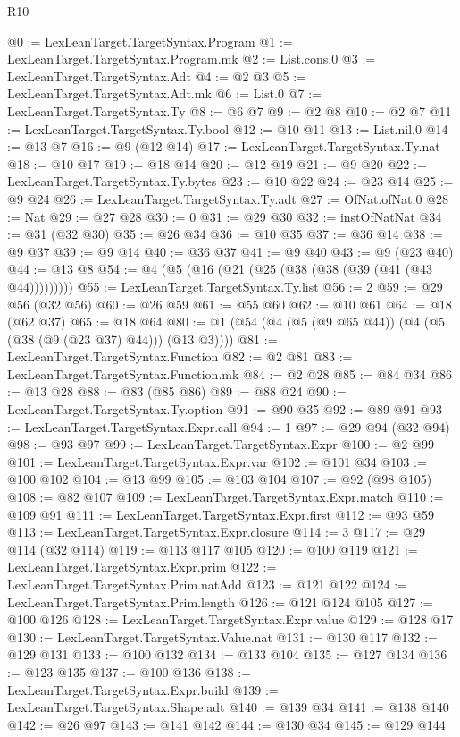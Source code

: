 \begin{lexlean}{R10}
\begin{coremodule}
@0 := LexLeanTarget.TargetSyntax.Program
@1 := LexLeanTarget.TargetSyntax.Program.mk
@2 := List.cons.{0}
@3 := LexLeanTarget.TargetSyntax.Adt
@4 := @2 @3
@5 := LexLeanTarget.TargetSyntax.Adt.mk
@6 := List.{0}
@7 := LexLeanTarget.TargetSyntax.Ty
@8 := @6 @7
@9 := @2 @8
@10 := @2 @7
@11 := LexLeanTarget.TargetSyntax.Ty.bool
@12 := @10 @11
@13 := List.nil.{0}
@14 := @13 @7
@16 := @9 (@12 @14)
@17 := LexLeanTarget.TargetSyntax.Ty.nat
@18 := @10 @17
@19 := @18 @14
@20 := @12 @19
@21 := @9 @20
@22 := LexLeanTarget.TargetSyntax.Ty.bytes
@23 := @10 @22
@24 := @23 @14
@25 := @9 @24
@26 := LexLeanTarget.TargetSyntax.Ty.adt
@27 := OfNat.ofNat.{0}
@28 := Nat
@29 := @27 @28
@30 := 0
@31 := @29 @30
@32 := instOfNatNat
@34 := @31 (@32 @30)
@35 := @26 @34
@36 := @10 @35
@37 := @36 @14
@38 := @9 @37
@39 := @9 @14
@40 := @36 @37
@41 := @9 @40
@43 := @9 (@23 @40)
@44 := @13 @8
@54 := @4 (@5 (@16 (@21 (@25 (@38 (@38 (@39 (@41 (@43 @44)))))))))
@55 := LexLeanTarget.TargetSyntax.Ty.list
@56 := 2
@59 := @29 @56 (@32 @56)
@60 := @26 @59
@61 := @55 @60
@62 := @10 @61
@64 := @18 (@62 @37)
@65 := @18 @64
@80 := @1 (@54 (@4 (@5 (@9 @65 @44)) (@4 (@5 (@38 (@9 (@23 @37) @44))) (@13 @3))))
@81 := LexLeanTarget.TargetSyntax.Function
@82 := @2 @81
@83 := LexLeanTarget.TargetSyntax.Function.mk
@84 := @2 @28
@85 := @84 @34
@86 := @13 @28
@88 := @83 (@85 @86)
@89 := @88 @24
@90 := LexLeanTarget.TargetSyntax.Ty.option
@91 := @90 @35
@92 := @89 @91
@93 := LexLeanTarget.TargetSyntax.Expr.call
@94 := 1
@97 := @29 @94 (@32 @94)
@98 := @93 @97
@99 := LexLeanTarget.TargetSyntax.Expr
@100 := @2 @99
@101 := LexLeanTarget.TargetSyntax.Expr.var
@102 := @101 @34
@103 := @100 @102
@104 := @13 @99
@105 := @103 @104
@107 := @92 (@98 @105)
@108 := @82 @107
@109 := LexLeanTarget.TargetSyntax.Expr.match
@110 := @109 @91
@111 := LexLeanTarget.TargetSyntax.Expr.first
@112 := @93 @59
@113 := LexLeanTarget.TargetSyntax.Expr.closure
@114 := 3
@117 := @29 @114 (@32 @114)
@119 := @113 @117 @105
@120 := @100 @119
@121 := LexLeanTarget.TargetSyntax.Expr.prim
@122 := LexLeanTarget.TargetSyntax.Prim.natAdd
@123 := @121 @122
@124 := LexLeanTarget.TargetSyntax.Prim.length
@126 := @121 @124 @105
@127 := @100 @126
@128 := LexLeanTarget.TargetSyntax.Expr.value
@129 := @128 @17
@130 := LexLeanTarget.TargetSyntax.Value.nat
@131 := @130 @117
@132 := @129 @131
@133 := @100 @132
@134 := @133 @104
@135 := @127 @134
@136 := @123 @135
@137 := @100 @136
@138 := LexLeanTarget.TargetSyntax.Expr.build
@139 := LexLeanTarget.TargetSyntax.Shape.adt
@140 := @139 @34
@141 := @138 @140
@142 := @26 @97
@143 := @141 @142
@144 := @130 @34
@145 := @129 @144

\end{coremodule}
\end{lexlean}
